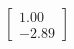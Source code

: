 \documentclass[preview]{standalone}
\begin{document}
\begin{align*}
\begin{bmatrix} 1.00 \\ -2.89 \end{bmatrix}
\end{align*}
\end{document}
